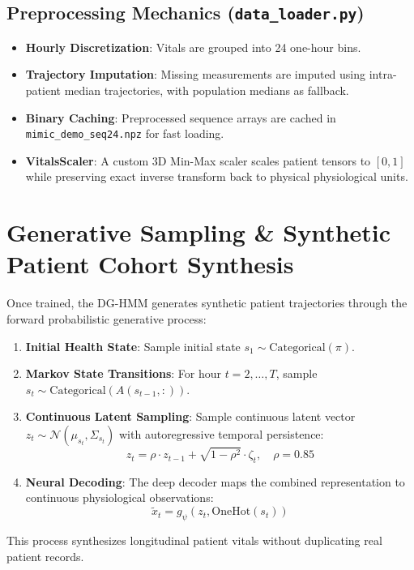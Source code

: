 \documentclass[11pt,a4paper]{article}
\begin{document}
\subsection{Preprocessing Mechanics (\texttt{data\_loader.py})}
\begin{itemize}
    \item \textbf{Hourly Discretization}: Vitals are grouped into 24 one-hour bins.
    \item \textbf{Trajectory Imputation}: Missing measurements are imputed using intra-patient median trajectories, with population medians as fallback.
    \item \textbf{Binary Caching}: Preprocessed sequence arrays are cached in \texttt{mimic\_demo\_seq24.npz} for fast loading.
    \item \textbf{VitalsScaler}: A custom 3D Min-Max scaler scales patient tensors to $[0, 1]$ while preserving exact inverse transform back to physical physiological units.
\end{itemize}

\section{Generative Sampling \& Synthetic Patient Cohort Synthesis}

Once trained, the DG-HMM generates synthetic patient trajectories through the forward probabilistic generative process:
\begin{enumerate}
    \item \textbf{Initial Health State}: Sample initial state $s_1 \sim \text{Categorical}(\pi)$.
    \item \textbf{Markov State Transitions}: For hour $t = 2, \dots, T$, sample $s_t \sim \text{Categorical}(A(s_{t-1}, :))$.
    \item \textbf{Continuous Latent Sampling}: Sample continuous latent vector $z_t \sim \mathcal{N}(\mu_{s_t}, \Sigma_{s_t})$ with autoregressive temporal persistence:
    \begin{equation}
        z_t = \rho \cdot z_{t-1} + \sqrt{1 - \rho^2} \cdot \zeta_t, \quad \rho = 0.85
    \end{equation}
    \item \textbf{Neural Decoding}: The deep decoder maps the combined representation to continuous physiological observations:
    \begin{equation}
        \tilde{x}_t = g_\psi(z_t, \text{OneHot}(s_t))
    \end{equation}
\end{enumerate}
This process synthesizes longitudinal patient vitals without duplicating real patient records.
\end{document}

